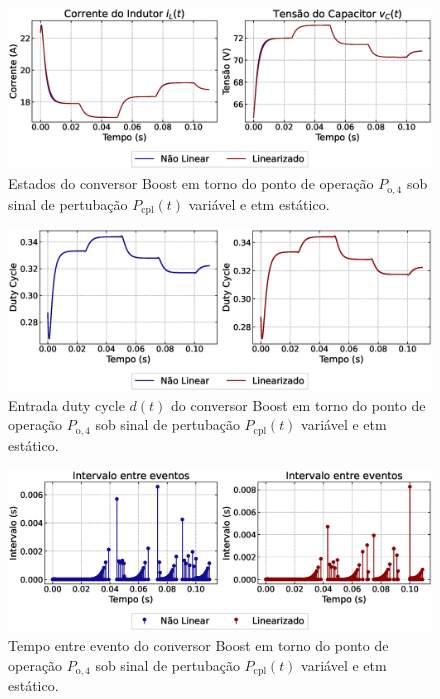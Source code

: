\begin{figure}[H]
  \centering
  \captionsetup{justification=centering}
  \includegraphics[width=1.\textwidth]{figuras/static-etm/boost/sim2/op2/result.eps}
  \caption{Estados do conversor Boost em torno do ponto de operação $P_{\mathrm{o}, 4}$ sob sinal de pertubação $P_{\mathrm{cpl}}(t)$ variável e \acrshort{etm} estático.}
\end{figure}

\begin{figure}[H]
  \centering
  \captionsetup{justification=centering}
  \includegraphics[width=1.\textwidth]{figuras/static-etm/boost/sim2/op2/duty-cycle.eps}
  \caption{Entrada duty cycle $d(t)$ do conversor Boost em torno do ponto de operação $P_{\mathrm{o}, 4}$ sob sinal de pertubação $P_{\mathrm{cpl}}(t)$ variável e \acrshort{etm} estático.}
\end{figure}

\begin{figure}[H]
  \centering
  \captionsetup{justification=centering}
  \includegraphics[width=1.\textwidth]{figuras/static-etm/boost/sim2/op2/inter-event-times.eps}
  \caption{Tempo entre evento do conversor Boost em torno do ponto de operação $P_{\mathrm{o}, 4}$ sob sinal de pertubação $P_{\mathrm{cpl}}(t)$ variável e \acrshort{etm} estático.}
\end{figure}


